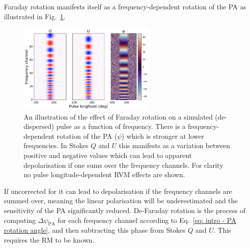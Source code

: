 Faraday rotation manifests itself as a frequency-dependent rotation of the PA as illustrated in Fig.~\ref{fig: intro - RM illustration}.
\begin{figure}
	\centering
	\includegraphics[width=0.6\textwidth]{Figures/Introduction/RM_effects}
    \caption[The effect of Faraday rotation on polarisation]{An illustration of the effect of Faraday rotation on a simulated (de-dispersed) pulse as a function of frequency. There is a frequency-dependent rotation of the PA ($\psi$) which is stronger at lower frequencies. In Stokes $Q$ and $U$ this manifests as a variation between positive and negative values which can lead to apparent depolarisation if one sums over the frequency channels. For clarity no pulse longitude-dependent RVM effects are shown.}
    \label{fig: intro - RM illustration} 
\end{figure}
If uncorrected for it can lead to depolarisation if the frequency channels are summed over, meaning the linear polarisation will be underestimated and the sensitivity of the PA significantly reduced. De-Faraday rotation is the process of computing $\Delta\psi_\mathrm{PA}$ for each frequency channel according to Eq.~\eqref{eq: intro - PA rotation angle}, and then subtracting this phase from Stokes $Q$ and $U$. This requires the RM to be known.


